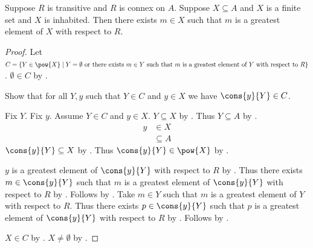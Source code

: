 \begin{theorem}\label{finite_greatest_element}
    Suppose $R$ is transitive and $R$ is connex on $A$.
    Suppose $X\subseteq A$ and $X$ is a finite set and $X$ is inhabited.
    Then there exists $m\in X$ such that
        $m$ is a greatest element of $X$ with respect to $R$.
\end{theorem}
\begin{proof}
    Let $C=\{Y\in\pow{X}\mid
        \text{$Y=\emptyset$ or there exists $m\in Y$ such that
            $m$ is a greatest element of $Y$ with respect to $R$}\}$.
    $\emptyset\in C$ by .

    Show that for all $Y,y$ such that $Y\in C$ and $y\in X$ we have
        $\cons{y}{Y}\in C$.
    \begin{subproof}
        Fix $Y$.
        Fix $y$.
        Assume $Y\in C$ and $y\in X$.
        $Y\subseteq X$ by .
        Thus $Y\subseteq A$ by .
        \begin{align*}
            y
                &\in X
                \\
                &\subseteq A
        \end{align*}
        $\cons{y}{Y}\subseteq X$ by .
        Thus $\cons{y}{Y}\in\pow{X}$ by .
        \begin{byCase}
            $y$ is a greatest element of $\cons{y}{Y}$ with respect to $R$
                by .
            Thus there exists $m\in\cons{y}{Y}$ such that
                $m$ is a greatest element of $\cons{y}{Y}$ with respect to $R$
                by .
            Follows by \auto.
            Take $m\in Y$ such that
                $m$ is a greatest element of $Y$ with respect to $R$.
            Thus there exists $p\in\cons{y}{Y}$ such that
                $p$ is a greatest element of $\cons{y}{Y}$ with respect to $R$
                by .
            Follows by \auto.
        \end{byCase}
    \end{subproof}
    $X\in C$ by .
    $X\neq\emptyset$ by .
\end{proof}

